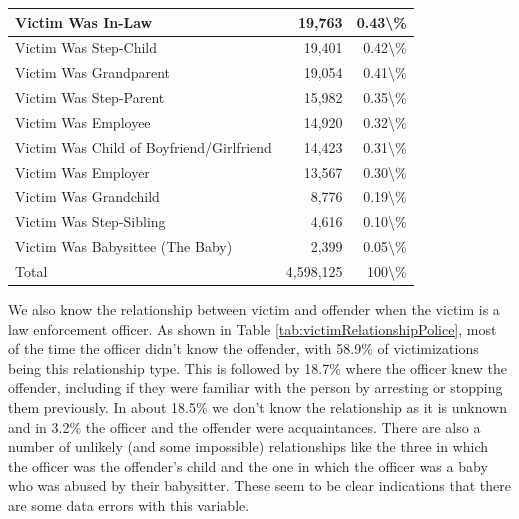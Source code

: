 \documentclass[
]{krantz}
\begin{document}
\begin{longtable}[t]{l|r|r}
\hline
Victim Was In-Law & 19,763 & 0.43\textbackslash{}\%\\
\hline
Victim Was Step-Child & 19,401 & 0.42\textbackslash{}\%\\
\hline
Victim Was Grandparent & 19,054 & 0.41\textbackslash{}\%\\
\hline
Victim Was Step-Parent & 15,982 & 0.35\textbackslash{}\%\\
\hline
Victim Was Employee & 14,920 & 0.32\textbackslash{}\%\\
\hline
Victim Was Child of Boyfriend/Girlfriend & 14,423 & 0.31\textbackslash{}\%\\
\hline
Victim Was Employer & 13,567 & 0.30\textbackslash{}\%\\
\hline
Victim Was Grandchild & 8,776 & 0.19\textbackslash{}\%\\
\hline
Victim Was Step-Sibling & 4,616 & 0.10\textbackslash{}\%\\
\hline
Victim Was Babysittee (The Baby) & 2,399 & 0.05\textbackslash{}\%\\
\hline
Total & 4,598,125 & 100\textbackslash{}\%\\
\hline
\end{longtable}

We also know the relationship between victim and offender
when the victim is a law enforcement officer. As shown in
Table \ref{tab:victimRelationshipPolice}, most of the time
the officer didn't know the offender, with 58.9\% of
victimizations being this relationship type. This is
followed by 18.7\% where the officer knew the offender,
including if they were familiar with the person by arresting
or stopping them previously. In about 18.5\% we don't know
the relationship as it is unknown and in 3.2\% the officer
and the offender were acquaintances. There are also a number
of unlikely (and some impossible) relationships like the
three in which the officer was the offender's child and the
one in which the officer was a baby who was abused by their
babysitter. These seem to be clear indications that there
are some data errors with this variable.
\end{document}

